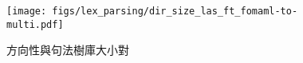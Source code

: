 \begin{figure}[h]
    \centering
    \texttt{[image: figs/lex\_parsing/dir\_size\_las\_ft\_fomaml-to-multi.pdf]}
    \caption{方向性與句法樹庫大小對}
    \label{fig:dir-size-las-ft-fomaml-to-multi}
\end{figure}